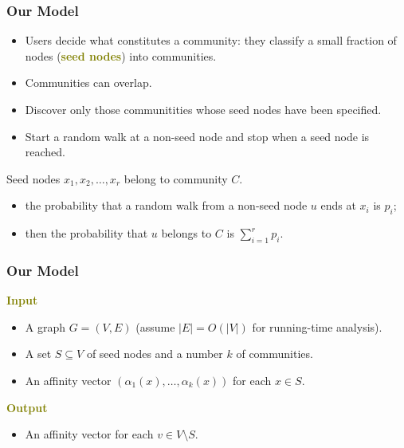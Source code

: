 \documentclass[xcolor=table]{beamer}
\newcommand{\highlight}[1]{\textcolor{olive}{\textbf{#1}}}
\begin{document}
\begin{frame}[t]
\frametitle{Our Model}
\begin{itemize}
	\item Users decide what constitutes a community: they classify
		a small fraction of nodes (\highlight{seed nodes}) into communities.
	\item Communities can overlap. 
	\item Discover only those communitities whose seed nodes have been specified.
	\item Start a random walk at a non-seed node and stop when a seed node is  
		reached.
\end{itemize}

Seed nodes $x_1, x_2, \ldots, x_r$ belong to community $C$. 
\begin{itemize}
	\item the probability that a random walk from a non-seed node $u$ 
		ends at $x_i$ is $p_i$; 
	\item then the probability that $u$ belongs to $C$ is $\sum_{i = 1}^r p_i$.
\end{itemize}
\end{frame}

\begin{frame}[t]
\frametitle{Our Model}
\highlight{Input}
\begin{itemize}
	\item A graph $G = (V,E)$ (assume $|E| = O(|V|)$ for running-time analysis).
	\item A set $S \subseteq V$ of seed nodes and a number $k$ of communities.
	\item An affinity vector $(\alpha_1(x), \ldots, \alpha_k(x))$ for each $x \in S$.
\end{itemize}

\medskip

\highlight{Output}
\begin{itemize}
	\item An affinity vector for each $v \in V \setminus S$. 
\end{itemize}
\end{frame}
\end{document}
